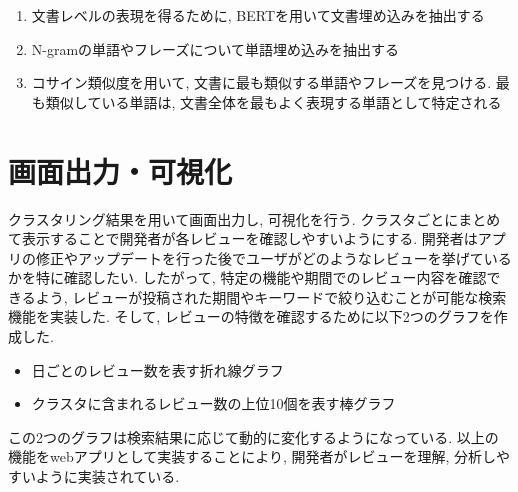 \begin{enumerate}
  \item 文書レベルの表現を得るために, BERTを用いて文書埋め込みを抽出する
  \item N-gramの単語やフレーズについて単語埋め込みを抽出する
  \item コサイン類似度を用いて, 文書に最も類似する単語やフレーズを見つける. 最も類似している単語は, 文書全体を最もよく表現する単語として特定される
\end{enumerate}


\section{画面出力・可視化}
クラスタリング結果を用いて画面出力し, 可視化を行う. クラスタごとにまとめて表示することで開発者が各レビューを確認しやすいようにする. 
開発者はアプリの修正やアップデートを行った後でユーザがどのようなレビューを挙げているかを特に確認したい. したがって, 特定の機能や期間でのレビュー内容を確認できるよう, レビューが投稿された期間やキーワードで絞り込むことが可能な検索機能を実装した. 
そして, レビューの特徴を確認するために以下2つのグラフを作成した.
\begin{itemize}
  \item 日ごとのレビュー数を表す折れ線グラフ
  \item クラスタに含まれるレビュー数の上位10個を表す棒グラフ
\end{itemize}
この2つのグラフは検索結果に応じて動的に変化するようになっている. 以上の機能をwebアプリとして実装することにより, 開発者がレビューを理解, 分析しやすいように実装されている. 